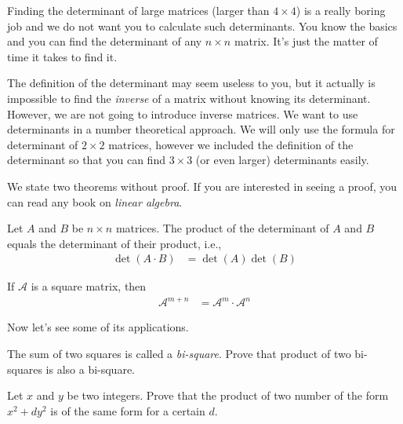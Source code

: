 \documentclass{subfile}
\begin{document}
Finding the determinant of large matrices (larger than $4 \times 4$) is a really boring job and we do not want you to calculate such determinants. You know the basics and you can find the determinant of any $n\times n$ matrix. It's just the matter of time it takes to find it.

The definition of the determinant may seem useless to you, but it actually is impossible to find the \textit{inverse} of a matrix without knowing its determinant. However, we are not going to introduce inverse matrices. We want to use determinants in a number theoretical approach. We will only use the formula for determinant of $2 \times 2$ matrices, however we included the definition of the determinant so that you can find $3 \times 3$ (or even larger) determinants easily.

We state two theorems without proof. If you are interested in seeing a proof, you can read any book on \textit{linear algebra}.

	\begin{theorem}
	Let $A$ and $B$ be $n\times n$ matrices. The product of the determinant of $A$ and $B$ equals the determinant of their product, i.e.,
		\begin{align*}
			\det(A \cdot B)
				& =\det(A)\det(B)
		\end{align*}
	\end{theorem}


\begin{theorem}
If $\mathcal A$ is a square matrix, then
	\begin{align*}
		\mathcal A^{m+n}
			& =\mathcal A^m \cdot \mathcal{A}^n
	\end{align*}
\end{theorem}

Now let's see some of its applications.

\begin{problem}
The sum of two squares is called a \textit{bi-square}. Prove that product of two bi-squares is also a bi-square.
\end{problem}

\begin{problem}
Let $x$ and $y$ be two integers. Prove that the product of two number of the form $x^2+dy^2$ is of the same form for a  certain $d$.
\end{problem}
\end{document}
